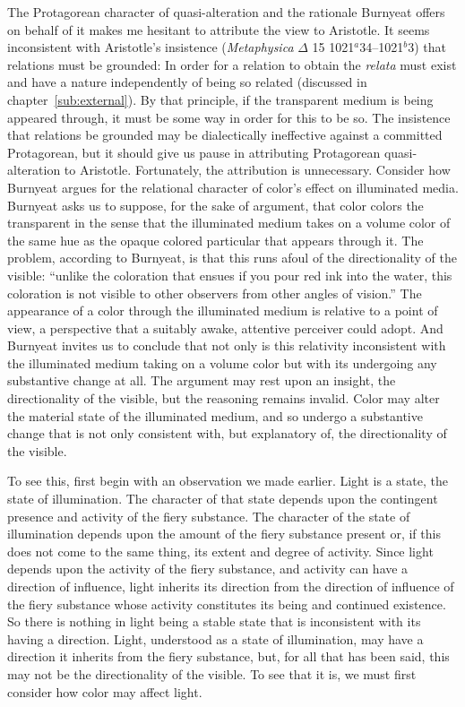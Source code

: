 The Protagorean character of quasi-alteration and the rationale Burnyeat offers on behalf of it makes me hesitant to attribute the view to Aristotle. It seems inconsistent with Aristotle's insistence (\emph{Metaphysica} \( \Delta \) 15 1021\( ^{a} \)34--1021\( ^{b} \)3) that relations must be grounded: In order for a relation to obtain the \emph{relata} must exist and have a nature independently of being so related (discussed in chapter~\ref{sub:external}). By that principle, if the transparent medium is being appeared through, it must be some way in order for this to be so. The insistence that relations be grounded may be dialectically ineffective against a committed Protagorean, but it should give us pause in attributing Protagorean quasi-alteration to Aristotle. Fortunately, the attribution is unnecessary. Consider how Burnyeat argues for the relational character of color's effect on illuminated media. Burnyeat asks us to suppose, for the sake of argument, that color colors the transparent in the sense that the illuminated medium takes on a volume color of the same hue as the opaque colored particular that appears through it. The problem, according to Burnyeat, is that this runs afoul of the directionality of the visible: ``unlike the coloration that ensues if you pour red ink into the water, this coloration is not visible to other observers from other angles of vision.'' The appearance of a color through the illuminated medium is relative to a point of view, a perspective that a suitably awake, attentive perceiver could adopt. And Burnyeat invites us to conclude that not only is this relativity inconsistent with the illuminated medium taking on a volume color but with its undergoing any substantive change at all. The argument may rest upon an insight, the directionality of the visible, but the reasoning remains invalid. Color may alter the material state of the illuminated medium, and so undergo a substantive change that is not only consistent with, but explanatory of, the directionality of the visible.

To see this, first begin with an observation we made earlier. Light is a state, the state of illumination. The character of that state depends upon the contingent presence and activity of the fiery substance. The character of the state of illumination depends upon the amount of the fiery substance present or, if this does not come to the same thing, its extent and degree of activity. Since light depends upon the activity of the fiery substance, and activity can have a direction of influence, light inherits its direction from the direction of influence of the fiery substance whose activity constitutes its being and continued existence. So there is nothing in light being a stable state that is inconsistent with its having a direction. Light, understood as a state of illumination, may have a direction it inherits from the fiery substance, but, for all that has been said, this may not be the directionality of the visible. To see that it is, we must first consider how color may affect light.


